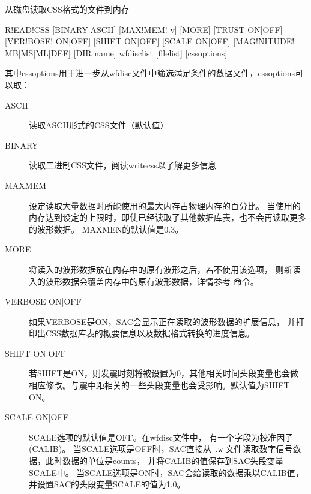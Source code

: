 \label{cmd:readcss}

从磁盘读取CSS格式的文件到内存

\begin{SACSTX}
R!EAD!CSS [BINARY|ASCII] [MAX!MEM! v] [MORE] [TRUST ON|OFF]
    [VER!BOSE! ON|OFF] [SHIFT ON|OFF] [SCALE ON|OFF]
    [MAG!NITUDE! MB|MS|ML|DEF] [DIR name] wfdisclist [filelist]
    [cssoptions]
\end{SACSTX}
其中cssoptions用于进一步从wfdisc文件中筛选满足条件的数据文件，cssoptions可以取：
\begin{SACSTX}
\end{SACSTX}

\begin{description}
\item [ASCII] 读取ASCII形式的CSS文件（默认值）
\item [BINARY] 读取二进制CSS文件，阅读writecss以了解更多信息
\item [MAXMEM] 设定读取大量数据时所能使用的最大内存占物理内存的百分比。
    当使用的内存达到设定的上限时，即使已经读取了其他数据库表，也不会再读取更多的波形数据。
    MAXMEN的默认值是0.3。
\item [MORE] 将读入的波形数据放在内存中的原有波形之后，若不使用该选项，
    则新读入的波形数据会覆盖内存中的原有波形数据，详情参考  命令。
\item [VERBOSE ON|OFF] 如果VERBOSE是ON，SAC会显示正在读取的波形数据的扩展信息，
    并打印出CSS数据库表的概要信息以及数据格式转换的进度信息。
\item [SHIFT ON|OFF] 若SHIFT是ON，则发震时刻将被设置为0，其他相关时间头段变量也会做
    相应修改。与震中距相关的一些头段变量也会受影响。默认值为SHIFT ON。
\item [SCALE ON|OFF] SCALE选项的默认值是OFF。在wfdisc文件中，
    有一个字段为校准因子(CALIB)。
    当SCALE选项是OFF时，SAC直接从 \texttt{.w} 文件读取数字信号数据，此时数据的单位是counts，
    并将CALIB的值保存到SAC头段变量SCALE中。
    当SCALE选项是ON时，SAC会给读取的数据乘以CALIB值，并设置SAC的头段变量SCALE的值为1.0。

\end{description}

